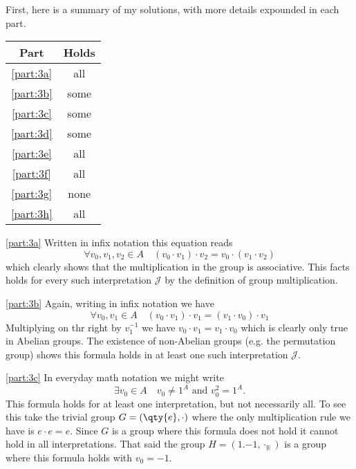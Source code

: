 \documentclass[boxes,pages,color=CornflowerBlue]{homework}
\begin{document}
\begin{solution}
    First, here is a summary of my solutions, with more details expounded in each part.
    \begin{table}[h]
        \centering\begin{tabular}{cc}
            Part          & Holds \\ \toprule
            \ref{part:3a} & all   \\
            \ref{part:3b} & some  \\
            \ref{part:3c} & some  \\
            \ref{part:3d} & some  \\
            \ref{part:3e} & all   \\
            \ref{part:3f} & all   \\
            \ref{part:3g} & none  \\
            \ref{part:3h} & all   \\
        \end{tabular}
    \end{table}

    \ref{part:3a}
    Written in infix notation this equation reads
    \begin{equation*}
        \forall v_0, v_1, v_2 \in A \quad (v_0 \cdot v_1) \cdot v_2 = v_0 \cdot (v_1 \cdot v_2)
    \end{equation*}
    which clearly shows that the multiplication in the group is associative.
    This facts holds for every such interpretation $\mathcal{J}$ by the definition of group multiplication.

    \ref{part:3b}
    Again, writing in infix notation we have
    \begin{equation*}
        \forall v_0, v_1 \in A \quad (v_0 \cdot v_1) \cdot v_1 = (v_1 \cdot v_0) \cdot v_1
    \end{equation*}
    Multiplying on thr right by $v_1^{-1}$ we have $v_0\cdot v_1 = v_1 \cdot v_0$ which is clearly only true in Abelian groups.
    The existence of non-Abelian groups (e.g. the permutation group) shows this formula holds in at least one such interpretation $\mathcal{J}$.

    \ref{part:3c}
    In everyday math notation we might write
    \begin{equation*}
        \exists v_0 \in A \quad v_0 \neq 1^A \text{ and } v_0^2 = 1^A.
    \end{equation*}
    This formula holds for at least one interpretation, but not necessarily all.
    To see this take the trivial group $G = (\qty{e}, \cdot)$ where the only multiplication rule we have is $e \cdot e = e$.
    Since $G$ is a group where this formula does not hold it cannot hold in all interpretations.
    That said the group $H = (\qty{1, -1}, \cdot_\mathbb{R})$ is a group where this formula holds with $v_0 = -1$.


\end{solution}
\end{document}
